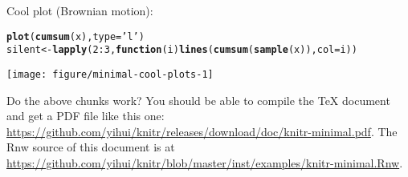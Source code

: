 \documentclass{article}\usepackage[]{graphicx}\usepackage[]{color}
\makeatletter
\newcommand{\hlnum}[1]{\textcolor[rgb]{0.686,0.059,0.569}{#1}}%
\newcommand{\hlstr}[1]{\textcolor[rgb]{0.192,0.494,0.8}{#1}}%
\newcommand{\hlopt}[1]{\textcolor[rgb]{0,0,0}{#1}}%
\newcommand{\hlstd}[1]{\textcolor[rgb]{0.345,0.345,0.345}{#1}}%
\newcommand{\hlkwa}[1]{\textcolor[rgb]{0.161,0.373,0.58}{\textbf{#1}}}%
\newcommand{\hlkwb}[1]{\textcolor[rgb]{0.69,0.353,0.396}{#1}}%
\newcommand{\hlkwc}[1]{\textcolor[rgb]{0.333,0.667,0.333}{#1}}%
\newcommand{\hlkwd}[1]{\textcolor[rgb]{0.737,0.353,0.396}{\textbf{#1}}}%
\newenvironment{kframe}{%
 \def\at@end@of@kframe{}%
 \ifinner\ifhmode%
  \def\at@end@of@kframe{\end{minipage}}%
  \begin{minipage}{\columnwidth}%
 \fi\fi%
 \def\FrameCommand##1{\hskip\@totalleftmargin \hskip-\fboxsep
 \colorbox{shadecolor}{##1}\hskip-\fboxsep
     \hskip-\linewidth \hskip-\@totalleftmargin \hskip\columnwidth}%
 \MakeFramed {\advance\hsize-\width
   \@totalleftmargin\z@ \linewidth\hsize
   \@setminipage}}%
 {\par\unskip\endMakeFramed%
 \at@end@of@kframe}
\newenvironment{knitrout}{}{} %
\makeatother
\begin{document}
Cool plot (Brownian motion):

\begin{knitrout}
\color{fgcolor}\begin{kframe}
\begin{alltt}
\hlkwd{plot}\hlstd{(}\hlkwd{cumsum}\hlstd{(x),} \hlkwc{type}\hlstd{=}\hlstr{'l'}\hlstd{)}
\hlstd{silent} \hlkwb{<-} \hlkwd{lapply}\hlstd{(}\hlnum{2}\hlopt{:}\hlnum{3}\hlstd{,} \hlkwa{function}\hlstd{(}\hlkwc{i}\hlstd{)} \hlkwd{lines}\hlstd{(}\hlkwd{cumsum}\hlstd{(}\hlkwd{sample}\hlstd{(x)),} \hlkwc{col}\hlstd{=i))}
\end{alltt}
\end{kframe}

{\centering \texttt{[image: figure/minimal-cool-plots-1]} 

}



\end{knitrout}

Do the above chunks work? You should be able to compile the \TeX{}
document and get a PDF file like this one: \url{https://github.com/yihui/knitr/releases/download/doc/knitr-minimal.pdf}.
The Rnw source of this document is at \url{https://github.com/yihui/knitr/blob/master/inst/examples/knitr-minimal.Rnw}.
\end{document}
